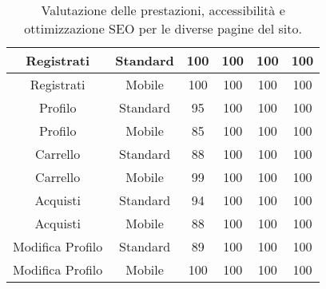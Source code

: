 \begin{table}[H]
\begin{tabular}{|c|c|c|c|c|c|}
        Registrati & Standard & 100 & 100 & 100 & 100 \\ 
        \hline
        \rowcolor[gray]{0.9}
        Registrati & Mobile & 100 & 100 & 100 & 100 \\ 
        \hline
        Profilo & Standard & 95 & 100 & 100 & 100 \\ 
        \hline
        \rowcolor[gray]{0.9}
        Profilo & Mobile & 85 & 100 & 100 & 100 \\ 
        \hline
        Carrello & Standard & 88 & 100 & 100 & 100 \\ 
        \hline
        \rowcolor[gray]{0.9}
        Carrello & Mobile & 99 & 100 & 100 & 100 \\ 
        \hline
        Acquisti & Standard & 94 & 100 & 100 & 100 \\ 
        \hline
        \rowcolor[gray]{0.9}
        Acquisti & Mobile & 88 & 100 & 100 & 100 \\ 
        \hline
        Modifica Profilo & Standard & 89 & 100 & 100 & 100 \\ 
        \hline
        \rowcolor[gray]{0.9}
        Modifica Profilo & Mobile & 100 & 100 & 100 & 100 \\ 
        \hline
    \end{tabular}
    \caption{Valutazione delle prestazioni, accessibilità e ottimizzazione SEO per le diverse pagine del sito.}
    \label{tab:prestazioni}
\end{table}
